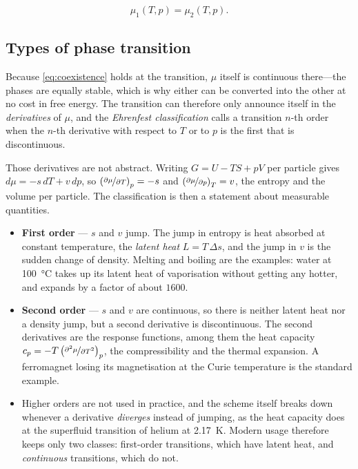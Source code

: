         \begin{equation}\label{eq:coexistence}
            \mu_1(T,p) = \mu_2(T,p).
        \end{equation}

    \subsection{Types of phase transition}

        Because \cref{eq:coexistence} holds at the transition, $\mu$ itself is continuous there---the phases are equally stable, which is why either can be converted into the other at no cost in free energy. The transition can therefore only announce itself in the \emph{derivatives} of $\mu$, and the \emph{Ehrenfest classification} calls a transition $n$-th order when the $n$-th derivative with respect to $T$ or to $p$ is the first that is discontinuous.

        Those derivatives are not abstract. Writing $G = U - TS + pV$ per particle gives $d\mu = -s\,dT + v\,dp$, so $\left(\nicefrac{\partial\mu}{\partial T}\right)_p = -s$ and $\left(\nicefrac{\partial\mu}{\partial p}\right)_T = v$, the entropy and the volume per particle. The classification is then a statement about measurable quantities.

        \begin{itemize}
            \item \textbf{First order} --- $s$ and $v$ jump. The jump in entropy is heat absorbed at constant temperature, the \emph{latent heat} $L = T\,\Delta s$, and the jump in $v$ is the sudden change of density. Melting and boiling are the examples: water at \qty{100}{\celsius} takes up its latent heat of vaporisation without getting any hotter, and expands by a factor of about $1600$.
            \item \textbf{Second order} --- $s$ and $v$ are continuous, so there is neither latent heat nor a density jump, but a second derivative is discontinuous. The second derivatives are the response functions, among them the heat capacity $c_p = -T\left(\nicefrac{\partial^{2}\mu}{\partial T^{2}}\right)_p$, the compressibility and the thermal expansion. A ferromagnet losing its magnetisation at the Curie temperature is the standard example.
            \item Higher orders are not used in practice, and the scheme itself breaks down whenever a derivative \emph{diverges} instead of jumping, as the heat capacity does at the superfluid transition of helium at \qty{2.17}{\kelvin}. Modern usage therefore keeps only two classes: first-order transitions, which have latent heat, and \emph{continuous} transitions, which do not.
        \end{itemize}

